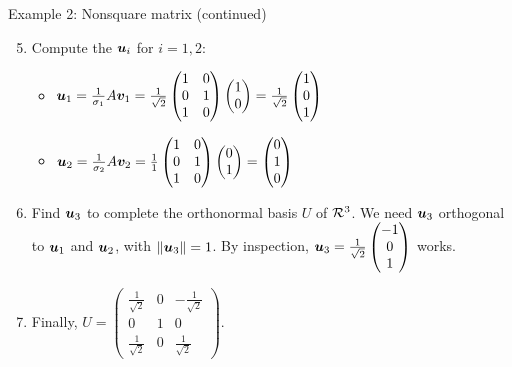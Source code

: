 \documentclass[aspectratio=169]{beamer}\usepackage[]{graphicx}\usepackage[]{xcolor}
\begin{document}
\begin{frame}{Example 2: Nonsquare matrix (continued)}
\begin{enumerate}
\setcounter{enumi}{4}
\item Compute the $\bm{u}_i$ for $i=1,2$:
\begin{itemize}
\item $\bm{u}_1 = \frac{1}{\sigma_1}A\bm{v}_1 = \frac{1}{\sqrt{2}}\begin{pmatrix} 1 & 0 \\ 0 & 1 \\ 1 & 0 \end{pmatrix}\begin{pmatrix} 1 \\ 0 \end{pmatrix} = \frac{1}{\sqrt{2}}\begin{pmatrix} 1 \\ 0 \\ 1 \end{pmatrix}$
\item $\bm{u}_2 = \frac{1}{\sigma_2}A\bm{v}_2 = \frac{1}{1}\begin{pmatrix} 1 & 0 \\ 0 & 1 \\ 1 & 0 \end{pmatrix}\begin{pmatrix} 0 \\ 1 \end{pmatrix} = \begin{pmatrix} 0 \\ 1 \\ 0 \end{pmatrix}$
\end{itemize}
\item Find $\bm{u}_3$ to complete the orthonormal basis $U$ of $\mathcal{R}^3$. We need $\bm{u}_3$ orthogonal to $\bm{u}_1$ and $\bm{u}_2$, with $\|\bm{u}_3\|=1$. By inspection, $\bm{u}_3 = \frac{1}{\sqrt{2}}\begin{pmatrix} -1 \\ 0 \\ 1 \end{pmatrix}$ works.
\item Finally, $U = \begin{pmatrix} \frac{1}{\sqrt{2}} & 0 & -\frac{1}{\sqrt{2}} \\ 0 & 1 & 0 \\ \frac{1}{\sqrt{2}} & 0 & \frac{1}{\sqrt{2}} \end{pmatrix}$.
\end{enumerate}
\end{frame}
\end{document}
